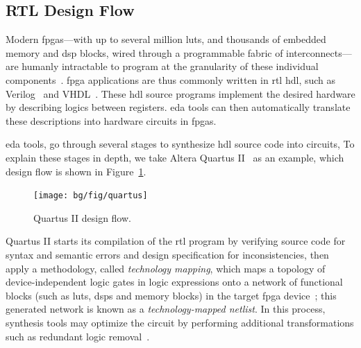 \subsection{RTL Design Flow}
\label{bg:sub:rtl_design}

Modern \glspl{fpga}---with up to several million \glspl{lut}, and thousands
of embedded memory and \gls{dsp} blocks, wired through a programmable fabric
of interconnects---are humanly intractable to program at the granularity of
these individual components~\cite{kapre08}.  \Gls{fpga} applications are
thus commonly written in \gls{rtl} \gls{hdl}, such as Verilog~\cite{verilog}
and VHDL~\cite{vhdl}.  These \gls{hdl} source programs implement the desired
hardware by describing logics between registers.  \Gls{eda} tools can
then automatically translate these descriptions into hardware circuits in
\glspl{fpga}.

\Gls{eda} tools, go through several stages to synthesize \gls{hdl} source
code into circuits, To explain these stages in depth, we take Altera
Quartus II~\cite{quartus} as an example, which design flow is shown in
Figure~\ref{fig:quartus}.
\begin{figure}[ht]
    \centering
    \texttt{[image: bg/fig/quartus]}
    \caption{Quartus II design flow.}\label{fig:quartus}
\end{figure}

Quartus II starts its compilation of the \gls{rtl} program by verifying
source code for syntax and semantic errors and design specification for
inconsistencies, then apply a methodology, called \emph{technology mapping},
which maps a topology of device-independent logic gates in logic expressions
onto a network of functional blocks (such as \glspl{lut}, \glspl{dsp}
and memory blocks) in the target \gls{fpga} device~\cite{cong08}; this
generated network is known as a \emph{technology-mapped netlist}.  In this
process, synthesis tools may optimize the circuit by performing additional
transformations such as redundant logic removal~\cite{quartus}.


